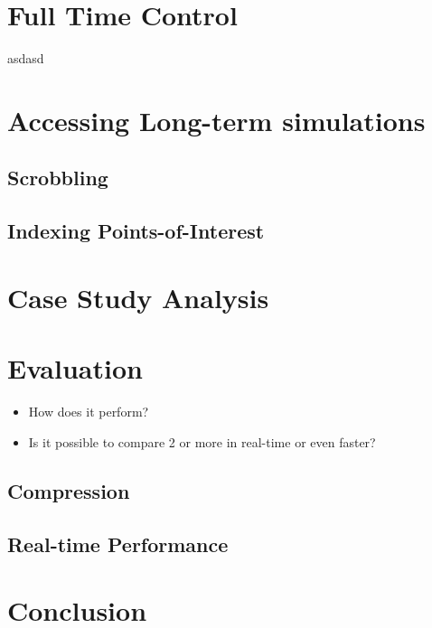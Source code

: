 \section{Full Time Control} %
\label{sec:full_time_control}
asdasd

\section{Accessing Long-term simulations} %
\label{sec:indexing_long_term_simulations}
\subsection{Scrobbling} %
\label{sub:scrobbling}

\subsection{Indexing Points-of-Interest} %
\label{sub:indexing_points_of_interest}

\section{Case Study Analysis}
\label{sec:Case Study Analysis}

\section{Evaluation}
\label{sec:Evaluation}
\begin{itemize}
  \item How does it perform?
  \item Is it possible to compare 2 or more in real-time or even faster?
\end{itemize}

\subsection{Compression} %
\label{sub:compression}


\subsection{Real-time Performance} %
\label{sub:real_time_performance}


\section{Conclusion}
\label{sec:Conclusion}
